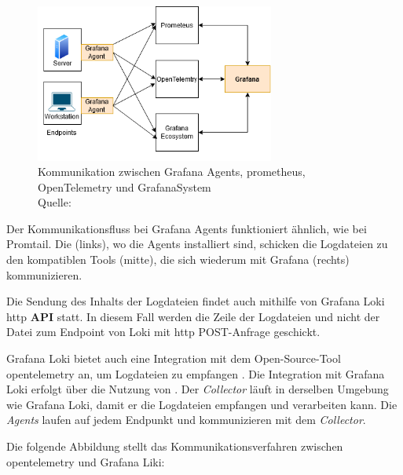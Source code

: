 \begin{figure}[H]
   \centering
   \includegraphics[width=0.7\textwidth]{assets/GrafanaAgents.drawio.png}
   \caption[Kommunikation zwischen Grafana Agents, \gls{prometheus}, OpenTelemetry und \gls{GrafanaSystem}]
   {Kommunikation zwischen Grafana Agents, \gls{prometheus}, OpenTelemetry und \gls{GrafanaSystem}\\Quelle: \citep{Grafana_Agents}}
   \label{fig:GrafAgents}
   \centering
\end{figure}

Der Kommunikationsfluss bei Grafana Agents funktioniert ähnlich, wie bei Promtail. Die  (links), wo die Agents installiert sind, schicken die Logdateien zu den kompatiblen Tools (mitte), die sich wiederum mit Grafana (rechts) kommunizieren.

Die Sendung des Inhalts der Logdateien findet auch mithilfe von Grafana Loki \gls{http} \textbf{\gls{API}} statt. In diesem Fall werden die Zeile der Logdateien und nicht der Datei zum \gls{Endpoint} von Loki mit \gls{http} POST-Anfrage geschickt. 

Grafana Loki bietet auch eine Integration mit dem Open-Source-Tool \gls{opentelemetry} an, um Logdateien zu empfangen \citep{Grafana_opentelemetry}. Die Integration mit Grafana Loki erfolgt über die Nutzung von . Der \textit{Collector} läuft in derselben Umgebung wie Grafana Loki, damit er die Logdateien empfangen und verarbeiten kann. Die \textit{Agents} laufen auf jedem Endpunkt und kommunizieren mit dem \textit{Collector}. 

\newpage
Die folgende Abbildung stellt das Kommunikationsverfahren zwischen \gls{opentelemetry} und Grafana Liki:

